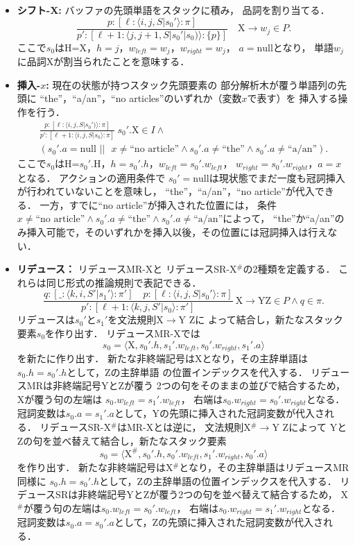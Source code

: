 \documentclass[japanese]{jnlp_1.4}
\begin{document}
\begin{itemize}
\item {\bf シフト-X:} バッファの先頭単語をスタックに積み，
品詞を割り当てる．
\[
\frac{p: [\ell: \langle i, j, S|s_{0}'\rangle: \pi]}{p': [\ell+1: \langle j, j+1, S|s_{0}'|s_{0})\rangle: \{p\}]}
	\quad \text{X}\rightarrow w_{j}\in P.
\]
ここで$s_{0}$はH=X，$h=j$，$w_{left}=w_{j}$，$w_{right}=w_{j}$，
$a=\text{null}$となり，
単語$w_{j}$に品詞Xが割当られたことを意味する．

\item {\bf 挿入-$x$:} 現在の状態が持つスタック先頭要素の
部分解析木が覆う単語列の先頭に
``the''，``a/an''，``no articles''のいずれか（変数$x$で表す）を
挿入する操作を行う．
\begin{multline*}
\frac{p: [\ell: \langle i, j, S|s_{0}')\rangle: \pi]}{p': [\ell+1: \langle i, j, S|s_{0}\rangle: \pi]}\ s_{0}'.\text{X} \in I\wedge \\
	(s_{0}'.a=\text{null }||\text{ }x\neq\text{``no article''}\wedge s_{0}'.a\neq\text{``the''}\wedge s_{0}'.a\neq\text{``a/an''}).
\end{multline*}
ここで$s_{0}$はH=$s_{0}'.$H，$h=s_{0}'.h$，$w_{left}=s_{0}'.w_{left}$，
$w_{right}=s_{0}'.w_{right}$，$a=x$となる．
アクションの適用条件で
$s_{0}'=\text{null}$は現状態でまだ一度も冠詞挿入が行われていないことを意味し，
``the''，``a/an''，``no article''が代入できる．
一方，すでに``no article''が挿入された位置には，
条件$x\neq\text{``no article''}\wedge s_{0}'.a\neq\text{``the''}\wedge s_{0}'.a\neq\text{``a/an''}$によって，
``the''か``a/an''のみ挿入可能で，そのいずれかを挿入以後，その位置には冠詞挿入は行えない．

\item {\bf リデュース：} リデュースMR-Xと
リデュースSR-X$^{\#}$の2種類を定義する．
これらは同じ形式の推論規則で表記できる．
\[
\frac{q: [\_: \langle k, i, S'|s_{1}'\rangle: \pi']
\quad 
p: [\ell: \langle i, j, S|s_{0}'\rangle: \pi]}{
p': [\ell+1: \langle k, j, S'|s_{0}\rangle: \pi']}\ \text{X}\rightarrow \text{Y}\text{Z}\in P \wedge q\in\pi.
\]
リデュースは$s_{0}'$と$s_{1}'$を文法規則X$\rightarrow$Y Zに
よって結合し，新たなスタック要素$s_{0}$を作り出す．
リデュースMR-Xでは
\[
s_{0}=\langle\text{X},s_{0}'.h,s_{1}'.w_{left},s_{0}'.w_{right},s_{1}'.a\rangle
\]
を新たに作り出す．
新たな非終端記号はXとなり，その主辞単語は$s_{0}.h=s_{0}'.h$として，Zの主辞単語
の位置インデックスを代入する．
リデュースMRは非終端記号YとZが覆う
2つの句をそのままの並びで結合するため，
Xが覆う句の左端は
$s_{0}.w_{left}=s_{1}'.w_{left}$，
右端は$s_{0}.w_{right}=s_{0}'.w_{right}$となる．
冠詞変数は$s_{0}.a=s_{1}'.a$として，Yの先頭に挿入された冠詞変数が代入される．
リデュースSR-X$^{\#}$はMR-Xとは逆に，
文法規則X$^{\#}\rightarrow$Y Zによって
YとZの句を並べ替えて結合し，新たなスタック要素
\[
s_{0}=\langle\text{X}^{\#},s_{0}'.h,s_{0}'.w_{left},s_{1}'.w_{right},s_{0}'.a\rangle
\]
を作り出す．
新たな非終端記号はX$^{\#}$となり，その主辞単語はリデュースMR同様に
$s_{0}.h=s_{0}'.h$として，Zの主辞単語の位置インデックスを代入する．
リデュースSRは非終端記号YとZが覆う2つの句を並べ替えて結合するため，
X$^{\#}$が覆う句の左端は$s_{0}.w_{left}=s_{0}'.w_{left}$，
右端は$s_{0}.w_{right}=s_{1}'.w_{right}$となる．
冠詞変数は$s_{0}.a=s_{0}'.a$として，Zの先頭に挿入された冠詞変数が代入される．


\end{itemize}
\end{document}
